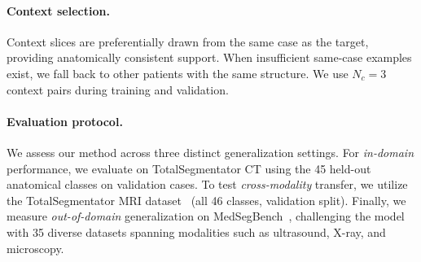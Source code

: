 \documentclass[10pt,twocolumn,letterpaper]{article}
\begin{document}
\paragraph{Context selection.}
Context slices are preferentially drawn from the same case as the target, providing anatomically consistent support. When insufficient same-case examples exist, we fall back to other patients with the same structure. We use $N_c = 3$ context pairs during training and validation.

\paragraph{Evaluation protocol.}
We assess our method across three distinct generalization settings. For \textit{in-domain} performance, we evaluate on TotalSegmentator CT using the 45 held-out anatomical classes on validation cases. To test \textit{cross-modality} transfer, we utilize the TotalSegmentator MRI dataset~\cite{dantonoliTotalSegmentatorMRIRobust2025} (all 46 classes, validation split). Finally, we measure \textit{out-of-domain} generalization on MedSegBench~\cite{kusMedSegBenchComprehensiveBenchmark2024}, challenging the model with 35 diverse datasets spanning modalities such as ultrasound, X-ray, and microscopy.
\end{document}
